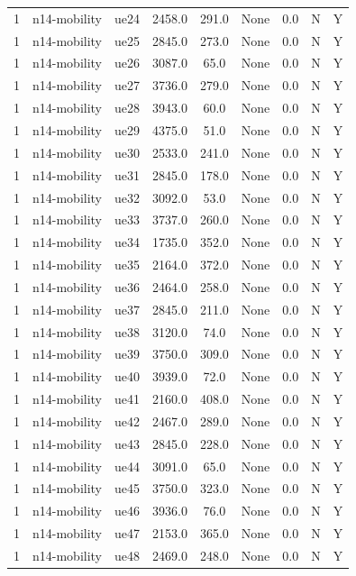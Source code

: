 \begin{table}[ht]
\begin{tabular}{|c|c|c|c|c|c|c|c|c|}
1 & n14-mobility & ue24 & 2458.0 & 291.0 & None & 0.0 & N & Y \\
1 & n14-mobility & ue25 & 2845.0 & 273.0 & None & 0.0 & N & Y \\
1 & n14-mobility & ue26 & 3087.0 & 65.0 & None & 0.0 & N & Y \\
1 & n14-mobility & ue27 & 3736.0 & 279.0 & None & 0.0 & N & Y \\
1 & n14-mobility & ue28 & 3943.0 & 60.0 & None & 0.0 & N & Y \\
1 & n14-mobility & ue29 & 4375.0 & 51.0 & None & 0.0 & N & Y \\
1 & n14-mobility & ue30 & 2533.0 & 241.0 & None & 0.0 & N & Y \\
1 & n14-mobility & ue31 & 2845.0 & 178.0 & None & 0.0 & N & Y \\
1 & n14-mobility & ue32 & 3092.0 & 53.0 & None & 0.0 & N & Y \\
1 & n14-mobility & ue33 & 3737.0 & 260.0 & None & 0.0 & N & Y \\
1 & n14-mobility & ue34 & 1735.0 & 352.0 & None & 0.0 & N & Y \\
1 & n14-mobility & ue35 & 2164.0 & 372.0 & None & 0.0 & N & Y \\
1 & n14-mobility & ue36 & 2464.0 & 258.0 & None & 0.0 & N & Y \\
1 & n14-mobility & ue37 & 2845.0 & 211.0 & None & 0.0 & N & Y \\
1 & n14-mobility & ue38 & 3120.0 & 74.0 & None & 0.0 & N & Y \\
1 & n14-mobility & ue39 & 3750.0 & 309.0 & None & 0.0 & N & Y \\
1 & n14-mobility & ue40 & 3939.0 & 72.0 & None & 0.0 & N & Y \\
1 & n14-mobility & ue41 & 2160.0 & 408.0 & None & 0.0 & N & Y \\
1 & n14-mobility & ue42 & 2467.0 & 289.0 & None & 0.0 & N & Y \\
1 & n14-mobility & ue43 & 2845.0 & 228.0 & None & 0.0 & N & Y \\
1 & n14-mobility & ue44 & 3091.0 & 65.0 & None & 0.0 & N & Y \\
1 & n14-mobility & ue45 & 3750.0 & 323.0 & None & 0.0 & N & Y \\
1 & n14-mobility & ue46 & 3936.0 & 76.0 & None & 0.0 & N & Y \\
1 & n14-mobility & ue47 & 2153.0 & 365.0 & None & 0.0 & N & Y \\
1 & n14-mobility & ue48 & 2469.0 & 248.0 & None & 0.0 & N & Y \\

\end{tabular}
\end{table}
